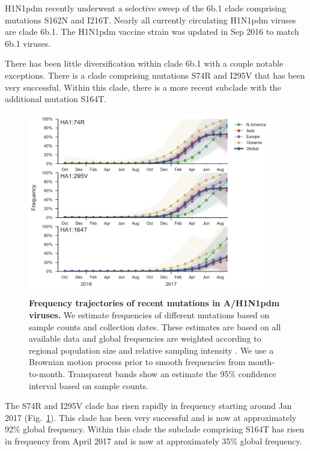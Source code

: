 \documentclass[11pt,oneside,letterpaper]{article}
\newcommand{\FIG}[1]{Fig.~\ref{#1}}
\begin{document}
H1N1pdm recently underwent a selective sweep of the 6b.1 clade
comprising mutations S162N and I216T. Nearly all currently circulating
H1N1pdm viruses are clade 6b.1. The H1N1pdm vaccine strain was updated
in Sep 2016 to match 6b.1 viruses.

There has been little diversification within clade 6b.1 with a couple
notable exceptions. There is a clade comprising mutations S74R and I295V
that has been very successful. Within this clade, there is a more recent
subclade with the additional mutation S164T.

\begin{figure}[H]
  \centering
  \includegraphics[width=0.95\textwidth]{../figures/sep-2017/h1n1pdm_mutations.png}
  \caption{\textbf{Frequency trajectories of recent mutations in A/H1N1pdm viruses.}
  We estimate frequencies of different mutations based on sample counts and collection dates.
  These estimates are based on all available data and global frequencies are weighted according to regional population size and relative sampling intensity .
  We use a Brownian motion process prior to smooth frequencies from month-to-month.
  Transparent bands show an estimate the 95\% confidence interval based on sample counts.
  }
  \label{h1n1pdm_mutations}
\end{figure}

The S74R and I295V clade has risen rapidly in frequency starting around
Jan 2017 (\FIG{h1n1pdm_mutations}). This clade has been very successful and is now at
approximately 92\% global frequency. Within this clade the subclade
comprising S164T has risen in frequency from April 2017 and is now at
approximately 35\% global frequency.
\end{document}
